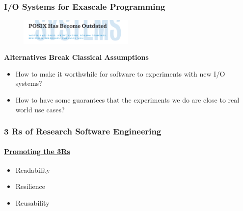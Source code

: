 \documentclass[aspectratio=1610,10pt]{penchbeamer}
\begin{document}
\begin{frame}
  \frametitle{I/O Systems for Exascale Programming}

  \begin{figure}
    \begin{center}
      \includegraphics[width=0.5\textwidth]{static/posix.png}
    \end{center}
  \end{figure}
  \vspace{2ex}

  \begin{center}
    \begin{large}
      \textbf{Alternatives Break Classical Assumptions}
    \end{large}
  \end{center}
  \begin{itemize}
    \item How to make it worthwhile for software to experiments with new I/O
      systems?
    \item How to have some guarantees that the experiments we do are close to
      real world use cases?
  \end{itemize}
\end{frame}


\begin{frame}
  \frametitle{3 Rs of Research Software Engineering}
  \framesubtitle{
  \href{https://hdsr.mitpress.mit.edu/pub/f0f7h5cu/release/2}{Promoting the 3Rs}}

  \begin{huge}
    \begin{itemize}
      \item Readability
      \item Resilience
      \item Reusability
    \end{itemize}
  \end{huge}

\end{frame}
\end{document}
